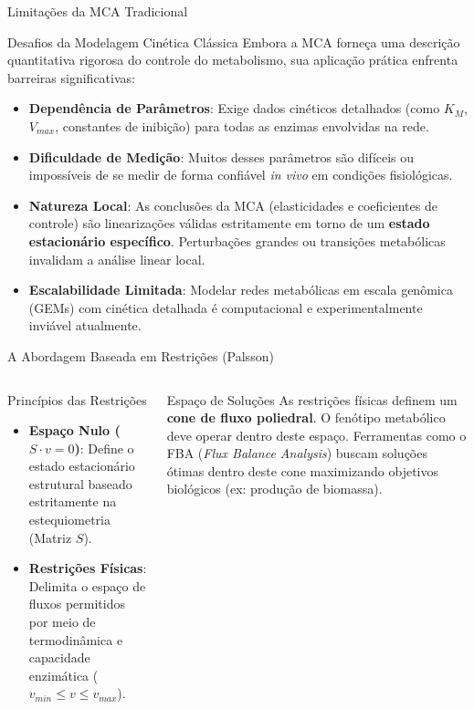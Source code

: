 \begin{frame}[shrink=10]{Limitações da MCA Tradicional}
\begin{block}{Desafios da Modelagem Cinética Clássica}
Embora a MCA forneça uma descrição quantitativa rigorosa do controle do metabolismo, sua aplicação prática enfrenta barreiras significativas:
\begin{itemize}
    \item \textbf{Dependência de Parâmetros}: Exige dados cinéticos detalhados (como $K_M$, $V_{max}$, constantes de inibição) para todas as enzimas envolvidas na rede.
    \item \textbf{Dificuldade de Medição}: Muitos desses parâmetros são difíceis ou impossíveis de se medir de forma confiável \textit{in vivo} em condições fisiológicas.
    \item \textbf{Natureza Local}: As conclusões da MCA (elasticidades e coeficientes de controle) são linearizações válidas estritamente em torno de um \textbf{estado estacionário específico}. Perturbações grandes ou transições metabólicas invalidam a análise linear local.
    \item \textbf{Escalabilidade Limitada}: Modelar redes metabólicas em escala genômica (GEMs) com cinética detalhada é computacional e experimentalmente inviável atualmente.
\end{itemize}
\end{block}
\end{frame}

\begin{frame}[shrink=10]{A Abordagem Baseada em Restrições (Palsson)}

\begin{columns}
\begin{block}{Princípios das Restrições}
\begin{itemize}
    \item \textbf{Espaço Nulo ($S \cdot v = 0$)}: Define o estado estacionário estrutural baseado estritamente na estequiometria (Matriz $S$).
    \item \textbf{Restrições Físicas}: Delimita o espaço de fluxos permitidos por meio de termodinâmica e capacidade enzimática ($v_{min} \le v \le v_{max}$).
\end{itemize}
\end{block}

\begin{exampleblock}{Espaço de Soluções}
As restrições físicas definem um \textbf{cone de fluxo poliedral}. O fenótipo metabólico deve operar dentro deste espaço. Ferramentas como o FBA (\textit{Flux Balance Analysis}) buscam soluções ótimas dentro deste cone maximizando objetivos biológicos (ex: produção de biomassa).
\end{exampleblock}
\end{columns}
\end{frame}

